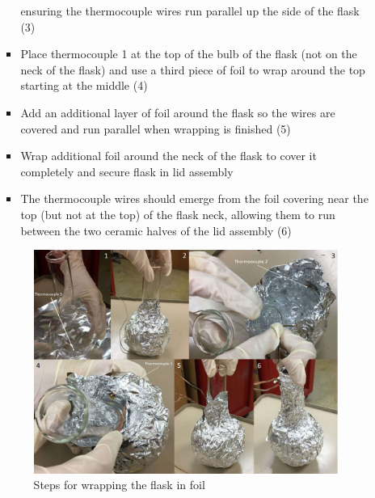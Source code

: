 \documentclass[letterpaper,11pt]{article}
\begin{document}
\begin{itemize}
\begin{itemize}
\begin{itemize}
                    ensuring the thermocouple wires run parallel up the side of 
                    the flask (3)
                \item Place thermocouple 1 at the top of the bulb of the flask 
                    (not on the neck of the flask) and use a third piece of foil
                     to wrap around the top starting at the middle (4)
                \item Add an additional layer of foil around  the flask so the 
                    wires are covered and run parallel when wrapping is finished
                    (5)
                \item Wrap additional foil around the neck of the flask to cover 
                    it completely and secure flask in lid assembly
                \item The thermocouple wires should emerge from the foil 
                    covering near the top (but not at the top) of the flask 
                    neck, allowing them to run between the two ceramic halves of
                    the lid assembly (6)
                \end{itemize}

\begin{figure}[H]
\centering
\includegraphics[width=1\textwidth]{wrap.jpg}
\caption{Steps for wrapping the flask in foil}
\label{fig:wrap}
\end{figure}


\end{itemize}
\end{itemize}
\end{document}
